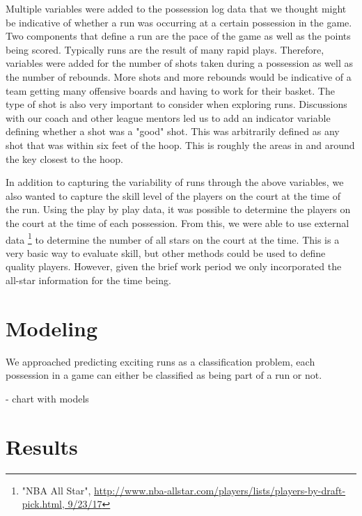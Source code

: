 \documentclass{article}
\begin{document}
Multiple variables were added to the possession log data that we thought might be indicative of whether a run was occurring at a certain possession in the game.  Two components that define a run are the pace of the game as well as the points being scored. Typically runs are the result of many rapid plays. Therefore, variables were added for the number of shots taken during a possession as well as the number of rebounds. More shots and more rebounds would be indicative of a team getting many offensive boards and having to work for their basket. The type of shot is also very important to consider when exploring runs. Discussions with our coach and other league mentors led us to add an indicator variable defining whether a shot was a "good" shot. This was arbitrarily defined as any shot that was within six feet of the hoop. This is roughly the areas in and around the key closest to the hoop. \newline

In addition to capturing the variability of runs through the above variables, we also wanted to capture the skill level of the players on the court at the time of the run. Using the play by play data, it was possible to determine the players on the court at the time of each possession. From this, we were able to use external data \footnote{"NBA All Star", \url{http://www.nba-allstar.com/players/lists/players-by-draft-pick.html, 9/23/17}} to determine the number of all stars on the court at the time. This is a very basic way to evaluate skill, but other methods could be used to define quality players. However, given the brief work period we only incorporated the all-star information for the time being. 

\section{Modeling}

We approached predicting exciting runs as a classification problem, each possession in a game can either be classified as being part of a run or not. 

- chart with models

\section{Results}
\end{document}

